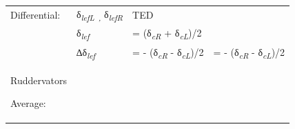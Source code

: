 \documentclass[
]{book}
\begin{document}
\begin{longtable}[]{@{}llll@{}}
\begin{minipage}[t]{0.35\columnwidth}
Differential:\strut
\end{minipage} & \begin{minipage}[t]{0.13\columnwidth}\raggedright
δ\emph{\textsubscript{lefL~,}} δ\emph{\textsubscript{lefR}}\strut
\end{minipage} & \begin{minipage}[t]{0.26\columnwidth}\raggedright
TED\strut
\end{minipage} & \begin{minipage}[t]{0.14\columnwidth}\raggedright
\strut
\end{minipage}\tabularnewline
\begin{minipage}[t]{0.35\columnwidth}\raggedright
\strut
\end{minipage} & \begin{minipage}[t]{0.13\columnwidth}\raggedright
δ\emph{\textsubscript{lef}}\strut
\end{minipage} & \begin{minipage}[t]{0.26\columnwidth}\raggedright
= (δ\emph{\textsubscript{cR}} + δ\emph{\textsubscript{cL}})/2\strut
\end{minipage} & \begin{minipage}[t]{0.14\columnwidth}\raggedright
\strut
\end{minipage}\tabularnewline
\begin{minipage}[t]{0.35\columnwidth}\raggedright
\strut
\end{minipage} & \begin{minipage}[t]{0.13\columnwidth}\raggedright
∆δ\emph{\textsubscript{lef}}\strut
\end{minipage} & \begin{minipage}[t]{0.26\columnwidth}\raggedright
= - (δ\emph{\textsubscript{cR}} - δ\emph{\textsubscript{cL}})/2\strut
\end{minipage} & \begin{minipage}[t]{0.14\columnwidth}\raggedright
= - (δ\emph{\textsubscript{cR}} - δ\emph{\textsubscript{cL}})/2\strut
\end{minipage}\tabularnewline
\begin{minipage}[t]{0.35\columnwidth}\raggedright
Ruddervators

Average:


\end{minipage}
\end{longtable}
\end{document}
